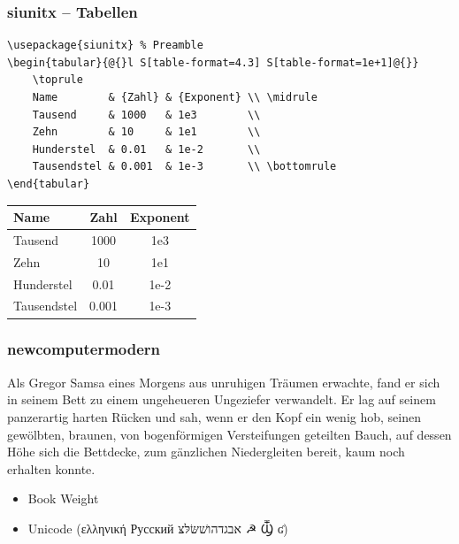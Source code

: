 \documentclass{beamer}
\begin{document}
\begin{frame}[fragile]
    \frametitle{siunitx -- Tabellen}
    \begin{lstlisting}[basicstyle=\ttfamily\footnotesize]
\usepackage{siunitx} % Preamble
\begin{tabular}{@{}l S[table-format=4.3] S[table-format=1e+1]@{}}
    \toprule
    Name        & {Zahl} & {Exponent} \\ \midrule
    Tausend     & 1000   & 1e3        \\
    Zehn        & 10     & 1e1        \\
    Hunderstel  & 0.01   & 1e-2       \\
    Tausendstel & 0.001  & 1e-3       \\ \bottomrule
\end{tabular}
    \end{lstlisting}
    \vspace*{-1ex}
    \begin{center}
        \begin{tabular}{@{}l S[table-format=4.3] S[table-format=1e+1]@{}}
            \toprule
            Name        & {Zahl} & {Exponent} \\ \midrule
            Tausend     & 1000   & 1e3        \\
            Zehn        & 10     & 1e1        \\
            Hunderstel  & 0.01   & 1e-2       \\
            Tausendstel & 0.001  & 1e-3       \\ \bottomrule
        \end{tabular}
    \end{center}
\end{frame}

\begin{frame}[fragile]
    \frametitle{newcomputermodern}
    \begin{multicols}{2}
        \small{}

        Als Gregor Samsa eines Morgens aus unruhigen Träumen erwachte, fand er sich in seinem Bett zu einem ungeheueren Ungeziefer verwandelt.
        Er lag auf seinem panzerartig harten Rücken und sah, wenn er den Kopf ein wenig hob, seinen gewölbten, braunen, von bogenförmigen Versteifungen geteilten Bauch, auf dessen Höhe sich die Bettdecke, zum gänzlichen Niedergleiten bereit, kaum noch erhalten konnte.
    \end{multicols}
    \begin{itemize}
        \item Book Weight
        \item Unicode (ελληνική Русский אבגדהושׁשּׂלּצּ  ☭ Ⳃ ʛ)
    \end{itemize}
\end{frame}
\end{document}
